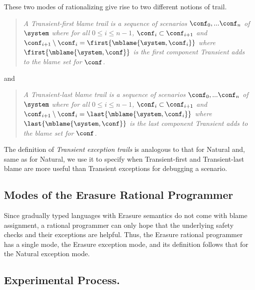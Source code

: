 These two modes of rationalizing give rise to two different notions of trail.
\begin{quote}
\it A \emph{Transient-first blame trail} is a sequence of scenarios
$\conf_0,...\conf_n$ of $\system$ where for all $0 \leq i \leq n - 1$,
$\conf_i \subset \conf_{i+1}$ and $\conf_{i+1} \setminus \conf_i =
\first{\mblame{\system, \conf_i}}$ where $\first{\mblame{\system, \conf}}$ is the
first component Transient adds to the blame set for $\conf$.
\end{quote}

and 

\begin{quote}
\it A \emph{Transient-last blame trail} is a sequence of scenarios
$\conf_0,...\conf_n$ of $\system$ where for all $0 \leq i \leq n - 1$,
$\conf_i \subset \conf_{i+1}$ and $\conf_{i+1} \setminus \conf_i =
  \last{\mblame{\system, \conf_i}}$ where $\last{\mblame{\system, \conf}}$ is the
last component Transient adds to the blame set for $\conf$.
\end{quote}

The definition of \emph{Transient exception trails} 
is analogous to that for Natural and, same as for Natural, we use it to  
specify when  
Transient-first and Transient-last blame are more useful than 
Transient exceptions for debugging a scenario.  


\subsection{Modes of the Erasure Rational Programmer} \label{sub:erasure}

 Since gradually typed languages with Erasure semantics do not come with
 blame assignment, a rational programmer can only hope that the underlying
 safety checks and their exceptions are helpful.  Thus, the Erasure 
 rational programmer has a single mode, the Erasure exception mode, and
 its definition follows that for
 the Natural exception mode.

\subsection{Experimental Process.}
\label{subsec:experiment}


